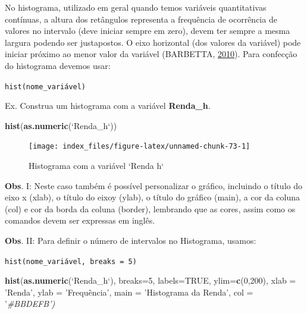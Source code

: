\documentclass[12pt,portuguese,oneside]{book}
\newenvironment{Shaded}{\begin{snugshade}}{\end{snugshade}}
\newcommand{\KeywordTok}[1]{\textcolor[rgb]{0.13,0.29,0.53}{\textbf{#1}}}
\newcommand{\DataTypeTok}[1]{\textcolor[rgb]{0.13,0.29,0.53}{#1}}
\newcommand{\DecValTok}[1]{\textcolor[rgb]{0.00,0.00,0.81}{#1}}
\newcommand{\StringTok}[1]{\textcolor[rgb]{0.31,0.60,0.02}{#1}}
\newcommand{\CommentTok}[1]{\textcolor[rgb]{0.56,0.35,0.01}{\textit{#1}}}
\newcommand{\OtherTok}[1]{\textcolor[rgb]{0.56,0.35,0.01}{#1}}
\newcommand{\NormalTok}[1]{#1}
\begin{document}
No histograma, utilizado em geral quando temos variáveis quantitativas
contínuas, a altura dos retângulos representa a frequência de ocorrência
de valores no intervalo (deve iniciar sempre em zero), devem ter sempre
a mesma largura podendo ser justapostos. O eixo horizontal (dos valores
da variável) pode iniciar próximo ao menor valor da variável (BARBETTA,
\protect\hyperlink{ref-barbetta1988}{2010}). Para confecção do
histograma devemos usar:

\texttt{hist(nome\_variável)}

Ex. Construa um histograma com a variável \textbf{Renda\_h}.

\begin{Shaded}
\begin{Highlighting}[]
\KeywordTok{hist}\NormalTok{(}\KeywordTok{as.numeric}\NormalTok{(}\StringTok{`}\DataTypeTok{Renda_h}\StringTok{`}\NormalTok{))}
\end{Highlighting}
\end{Shaded}

\begin{figure}[H]

{\centering \texttt{[image: index\_files/figure-latex/unnamed-chunk-73-1]} 

}

\caption{Histograma com a variável `Renda h`}\label{fig:unnamed-chunk-73}
\end{figure}

\textbf{Obs}. I: Neste caso também é possível personalizar o gráfico,
incluindo o título do eixo x (xlab), o título do eixoy (ylab), o título
do gráfico (main), a cor da coluna (col) e cor da borda da coluna
(border), lembrando que as cores, assim como os comandos devem ser
expressas em inglês.

\textbf{Obs}. II: Para definir o número de intervalos no Histograma,
usamos:

\texttt{hist(nome\_variável,\ breaks\ =\ 5)}

\begin{Shaded}
\begin{Highlighting}[]
\KeywordTok{hist}\NormalTok{(}\KeywordTok{as.numeric}\NormalTok{(}\StringTok{`}\DataTypeTok{Renda_h}\StringTok{`}\NormalTok{), }
     \DataTypeTok{breaks=}\DecValTok{5}\NormalTok{, }
     \DataTypeTok{labels=}\OtherTok{TRUE}\NormalTok{, }
     \DataTypeTok{ylim=}\KeywordTok{c}\NormalTok{(}\DecValTok{0}\NormalTok{,}\DecValTok{200}\NormalTok{), }
     \DataTypeTok{xlab =} \StringTok{'Renda'}\NormalTok{,}
     \DataTypeTok{ylab =} \StringTok{'Frequência',}
\StringTok{     main = '}\NormalTok{Histograma da Renda}\StringTok{',}
\StringTok{     col = '}\CommentTok{#BBDEFB')}
\end{Highlighting}
\end{Shaded}
\end{document}
